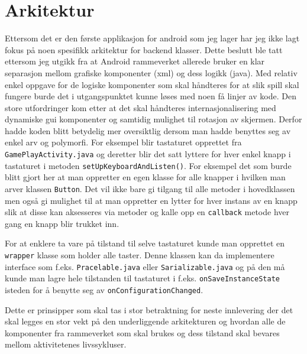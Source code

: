 \section{Arkitektur}
Ettersom det er den første applikasjon for android som jeg lager har jeg ikke lagt fokus på noen spesifikk arkitektur for backend klasser. Dette beslutt ble tatt ettersom jeg utgikk fra at Android rammeverket allerede bruker en klar separasjon mellom grafiske komponenter (xml) og dess logikk (java). Med relativ enkel oppgave for de logiske komponenter som skal håndteres for at slik spill skal fungere burde det i utgangspunktet kunne løses med noen få linjer av kode. Den store utfordringer kom etter at det skal håndteres internasjonalisering med dynamiske gui komponenter og samtidig mulighet til rotasjon av skjermen. Derfor hadde koden blitt betydelig mer oversiktlig dersom man hadde benyttes seg av enkel arv og polymorfi. For eksempel blir tastaturet opprettet fra \texttt{GamePlayActivity.java} og deretter blir det satt lyttere for hver enkel knapp i tastaturet i metoden \texttt{setUpKeyboardAndListen()}. For eksempel det som burde blitt gjort her at man oppretter en egen klasse for alle knapper i hvilken man arver klassen \texttt{Button}. Det vil ikke bare gi tilgang til alle metoder i hovedklassen men også gi mulighet til at man oppretter en lytter for hver instans av en knapp slik at disse kan aksesseres via metoder og kalle opp en \texttt{callback} metode hver gang en knapp blir trukket inn.

For at enklere ta vare på tilstand til selve tastaturet kunde man opprettet en \texttt{wrapper} klasse som holder alle taster. Denne klassen kan da implementere interface som f.eks. \texttt{Pracelable.java} eller \texttt{Sarializable.java} og på den må kunde man lagre hele tilstanden til tastaturet i f.eks. \texttt{onSaveInstanceState} isteden for å benytte seg av \texttt{onConfigurationChanged}. 

Dette er prinsipper som skal tas i stor betraktning for neste innlevering der det skal legges en stor vekt på den underliggende arkitekturen og hvordan alle de komponenter fra rammeverket som skal brukes og dess tilstand skal bevares mellom aktivitetenes livssykluser. 

